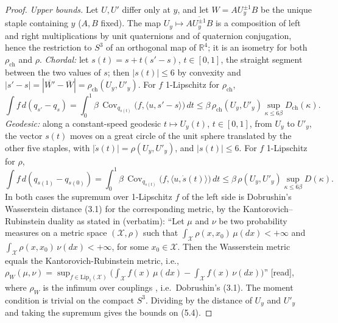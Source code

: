\documentclass[11pt,a4paper]{article}
\theoremstyle{remark}
\theoremstyle{definition}
\theoremstyle{plain}
\theoremstyle{remark}
\newcommand{\R}{\mathbb{R}}
\newcommand{\Cov}{\operatorname{Cov}}
\newcommand{\st}[1]{\textsf{[#1]}}
\newcommand{\Dch}{D_{\mathrm{ch}}}
\newcommand{\rch}{\rho_{\mathrm{ch}}}
\begin{document}
\begin{proof}
\emph{Upper bounds.} Let $U,U'$ differ only at $y$, and let $W=AU_y^{\pm1}B$ be the unique staple
containing $y$ ($A,B$ fixed). The map $U_y\mapsto\overline{AU_y^{\pm1}B}$ is a composition of left and right
multiplications by unit quaternions and of quaternion conjugation, hence the restriction to $S^3$ of an
orthogonal map of $\R^4$; it is an isometry for both $\rch$ and $\rho$.
\emph{Chordal:} let $s(t)=s+t(s'-s)$, $t\in[0,1]$, the straight segment between the two values of $s$; then
$|s(t)|\le6$ by convexity and $|s'-s|=|\overline{W'}-\overline W|=\rch(U_y,U'_y)$. For $f$ 1-Lipschitz for $\rch$,
\[
\int f\,d(q_{s'}-q_{s})=\int_0^1\beta\,\Cov_{q_{s(t)}}\big(f,\langle u,s'-s\rangle\big)\,dt
\le\beta\,\rch(U_y,U'_y)\sup_{\kappa\le6\beta}\Dch(\kappa).
\]
\emph{Geodesic:} along a constant-speed geodesic $t\mapsto U_y(t)$, $t\in[0,1]$, from
$U_y$ to $U'_y$, the vector $s(t)$ moves on a great circle of the unit sphere translated by the
other five staples, with $|\dot s(t)|=\rho(U_y,U'_y)$, and $|s(t)|\le6$. For $f$ 1-Lipschitz for $\rho$,
\[
\int f\,d(q_{s(1)}-q_{s(0)})=\int_0^1\beta\,\Cov_{q_{s(t)}}\big(f,\langle u,\dot s(t)\rangle\big)\,dt
\le\beta\,\rho(U_y,U'_y)\sup_{\kappa\le6\beta}D(\kappa).
\]
In both cases the supremum over 1-Lipschitz $f$ of the left side is Dobrushin's Wasserstein distance (3.1)
for the corresponding metric, by the Kantorovich--Rubinstein duality as stated in \cite[Thm~10.8, p.~53]{DS25} (verbatim):
``Let $\mu$ and $\nu$ be two probability measures on a metric space $(\mathcal X,\rho)$ such that
$\int_{\mathcal X}\rho(x,x_0)\,\mu(dx)<+\infty$ and $\int_{\mathcal X}\rho(x,x_0)\,\nu(dx)<+\infty$, for some
$x_0\in\mathcal X$. Then the Wasserstein metric equals the Kantorovich-Rubinstein metric, i.e.,
$\rho_W(\mu,\nu)=\sup_{f\in\mathrm{Lip}_1(\mathcal X)}\big(\int_{\mathcal X}f(x)\,\mu(dx)-\int_{\mathcal X}f(x)\,\nu(dx)\big)$''
\st{read}, where $\rho_W$ is the infimum over couplings \cite[(2.1), p.~6]{DS25}, i.e.\ Dobrushin's (3.1).
The moment condition is trivial on the compact $S^3$. Dividing by the distance of $U_y$ and $U'_y$ and taking the
supremum gives the bounds on (5.4).


\end{proof}
\end{document}

